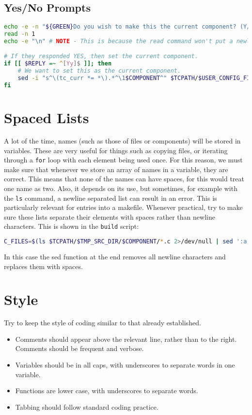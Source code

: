 \documentclass[a4paper, oneside, 11pt, titlepage, onecolumn, openright]{report}
\begin{document}
\subsection{Yes/No Prompts}
			\label{ss:YNPrompts}
			
\begin{lstlisting}[frame=trBL, breaklines=true, language = bash]
echo -e -n "${GREEN}Do you wish to make this the current component? (Y/N)${NO_COLOUR}"
read -n 1
echo -e "\n" # NOTE - This is because the read command won't put a newline after it reads a character.	

# If they responded YES, then set the current component.	
if [[ $REPLY =~ ^[Yy]$ ]]; then
	# We want to set this as the current component.
	sed -i "s^\(tc_curr *= *\).*^\1$COMPONENT^" $TCPATH/$USER_CONFIG_FILE
fi			
\end{lstlisting}

\section{Spaced Lists}
			\label{s:SpacedLists}
			A lot of the time, names (such as those of files or components) will be stored in variables. These are very useful for things such as copying files, or iterating through a \texttt{for} loop with each element being used once. 
			For this reason, we must make sure that whenever we store an array of names in a variable, they are correct. This means that none of the names can have spaces, for this would treat one name as two. 
			Also, it depends on its use, but sometimes, for example with the \texttt{ls} command, a newline separated list can result in an error. This is particularly relevant for entries into a makefile. Whenever practical, try to make sure these lists separate their elements with spaces rather than newline characters. 
			This is shown in the \texttt{build} script:
			
\begin{lstlisting}[frame=trBL, breaklines=true, language = bash]
C_FILES=$(ls $TCPATH/$TMP_SRC_DIR/$COMPONENT/*.c 2>/dev/null | sed ':a;N;$!ba;s/\n/ /g')
\end{lstlisting}

			In this case the sed function at the end removes all newline characters and replaces them with spaces.

\section{Style}
			\label{s:Style}
			Try to keep the style of coding similar to that already established. 
\begin{itemize}
\item Comments should appear above the relevant line, rather than to the right. Comments should be frequent and verbose.
\item Variables should be in all caps, with underscores to separate words in one variable.
\item Functions are lower case, with underscores to separate words.
\item Tabbing should follow standard coding practice.
\end{itemize}
			
\end{document}
